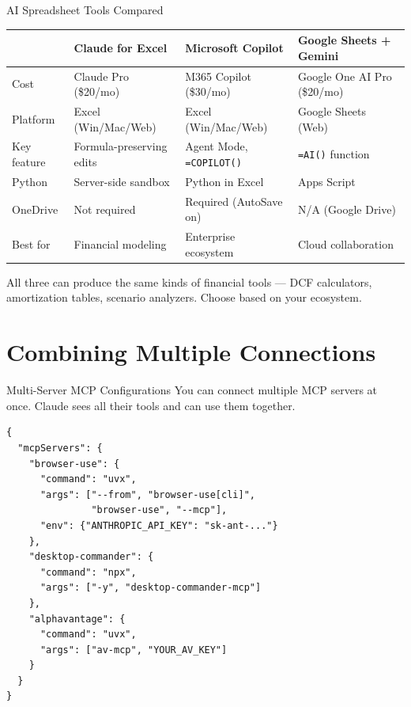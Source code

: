 \documentclass[aspectratio=169]{beamer}
\begin{document}
\begin{frame}[shrink=3]{AI Spreadsheet Tools Compared}
\begin{center}
\scriptsize
\begin{tabular}{p{2.5cm} p{3.2cm} p{3.2cm} p{3.2cm}}
\toprule
 & \textbf{Claude for Excel} & \textbf{Microsoft Copilot} & \textbf{Google Sheets + Gemini} \\
\midrule
Cost & Claude Pro (\$20/mo) & M365 Copilot (\$30/mo) & Google One AI Pro (\$20/mo) \\
Platform & Excel (Win/Mac/Web) & Excel (Win/Mac/Web) & Google Sheets (Web) \\
Key feature & Formula-preserving edits & Agent Mode, \texttt{=COPILOT()} & \texttt{=AI()} function \\
Python & Server-side sandbox & Python in Excel & Apps Script \\
OneDrive & Not required & Required (AutoSave on) & N/A (Google Drive) \\
Best for & Financial modeling & Enterprise ecosystem & Cloud collaboration \\
\bottomrule
\end{tabular}
\end{center}
\vspace{0.2cm}
All three can produce the same kinds of financial tools --- DCF calculators, amortization tables, scenario analyzers.  Choose based on your ecosystem.
\end{frame}

\section{Combining Multiple Connections}

\begin{frame}[fragile,shrink=10]{Multi-Server MCP Configurations}
You can connect multiple MCP servers at once. Claude sees all their tools and can use them together.
\vspace{0.2cm}
\begin{verbatim}
{
  "mcpServers": {
    "browser-use": {
      "command": "uvx",
      "args": ["--from", "browser-use[cli]",
               "browser-use", "--mcp"],
      "env": {"ANTHROPIC_API_KEY": "sk-ant-..."}
    },
    "desktop-commander": {
      "command": "npx",
      "args": ["-y", "desktop-commander-mcp"]
    },
    "alphavantage": {
      "command": "uvx",
      "args": ["av-mcp", "YOUR_AV_KEY"]
    }
  }
}
\end{verbatim}
\end{frame}
\end{document}
